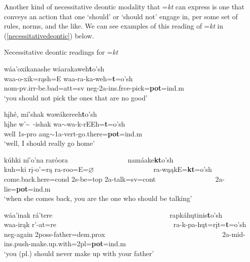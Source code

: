 Another kind of necessitative deontic modality that =\textit{kt} can express is one that conveys an action that one `should' or `should not' engage in, per some set of rules, norms, and the like. We can see examples of this reading of =\textit{kt} in (\ref{necessitativedeontic}) below.

\begin{exe}

\item\label{necessitativedeontic} Necessitative deontic readings for =\textit{kt}

	\begin{xlist}
	
	\item\label{necessitativedeontic1}
	\glll wáa'oxikanashe wáarakaweh\textbf{t}o'sh\\
	waa-o-xik=rąsh=E waa-ra-ka-weh=\textbf{t}=o'sh\\
	nom-pv.irr-\textnormal{be.bad}=att=sv neg-2a-ins.frce-\textnormal{pick}=\textbf{pot}=ind.m\\
	\glt `you should not pick the ones that are no good' \citep[216]{hollow1973a}

	\item\label{necessitativedeontic2}
	\glll hįhé, mí'shak wawákereeh\textbf{t}o'sh\\
	hįhe w'\~~-ishak wa$\sim$wa-k-rEEh=\textbf{t}=o'sh\\
	\textnormal{well} 1s-pro aug$\sim$1a-vert-\textnormal{go.there}=\textbf{pot}=ind.m\\
	\glt `well, I should really go home' \citep[217]{hollow1973a}

	\item\label{necessitativedeontic3}
	\glll kúhki ní'o'na raróora  ~ ~ ~ ~ ~ ~ ~ ~ ~ ~ namáake\textbf{kt}o'sh\\
	kuh=ki rį-o'=rą  ra-roo=E=$\varnothing$  ~ ~ ~ ~ ~ ~ ~ ~ ~ ~ ra-wąąkE=\textbf{kt}=o'sh\\
	\textnormal{come.back.here}=cond 2s-\textnormal{be}=top 2a-\textnormal{talk}=sv=cont ~ ~ ~ ~ ~ ~ ~ ~ ~ ~ 2a-\textnormal{lie}=\textbf{pot}=ind.m\\
	\glt `when she comes back, you are the one who should be talking' \citep[221]{hollow1973a}

	\item\label{necessitativedeontic4}
	\glll wáa'inak rá'tere ~ ~ ~ ~ ~ ~ ~ ~ ~ ~ ~ ~ ~ ~ ~ ~ ~ ~ ~ ~  rapkáhųtinis\textbf{t}o'sh\\
	waa-irąk r'-at=re ~ ~ ~ ~ ~ ~ ~ ~ ~ ~ ~ ~ ~ ~ ~ ~ ~ ~ ~ ~  ra-k-pa-hųt=rįt=\textbf{t}=o'sh\\
	neg-\textnormal{again} 2poss-\textnormal{father}=dem.prox
 ~ ~ ~ ~ ~ ~ ~ ~ ~ ~ ~ ~ ~ ~ ~ ~ ~ ~ ~ ~  2a-mid-ins.push-\textnormal{make.up.with}=2pl=\textbf{pot}=ind.m\\
	\glt `you (pl.) should never make up with your father' \citep[194]{hollow1973a}
	
	\end{xlist}

\end{exe}

